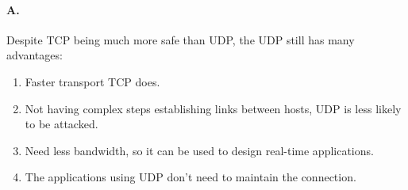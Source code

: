\paragraph{A.}
Despite TCP being much more safe than UDP, the UDP still has many advantages:
\begin{enumerate}
	\item Faster transport TCP does.
	
	\item Not having complex steps establishing links between hosts, UDP is less likely to be attacked.
	
	\item Need less bandwidth, so it can be used to design real-time applications.
	
	\item The applications using UDP don't need to maintain the connection.
\end{enumerate}